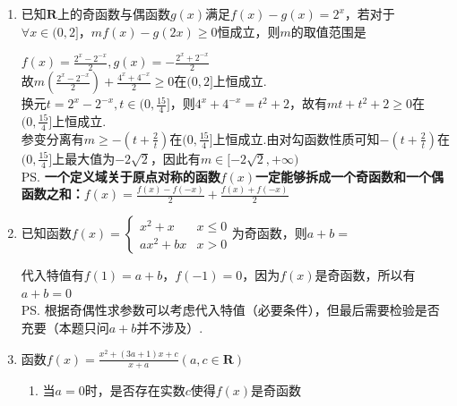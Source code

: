 \begin{enumerate}
\begin{enumerate}
\begin{jieda}
        把握定义求解有：$f(x) = \frac{a-\me^x}{1+a\cdot\me^x}, f(-x) = \frac{a-\me^{-x}}{1+a\cdot\me^{-x}} = \frac{a\me^{x}-1}{a+\me^{x}}$ \\
        由$f(x) = -f(-x)$知$\frac{a-\me^x}{1+a\cdot\me^x} = \frac{1-a\me^{x}}{a+\me^{x}}$，交叉相乘得到$a^2 - e^{2x} = 1-a^2e^{2x}$，移项整理得$(a^2-1) = (1-a^2)\cdot(e^{2x})$，因为此式恒成立，所以必有$a = \pm 1$
        \end{jieda}
        \item 已知$\mathbf{R}$上的奇函数与偶函数$g(x)$满足$f(x) - g(x) = 2^x$，若对于$\forall x \in (0, 2]$，$mf(x) - g(2x) \geq 0$恒成立，则$m$的取值范围是\blkda[2]{$[-2\sqrt{2}, +\infty)$}
        \begin{jieda}
            $f(x) = \frac{2^x - 2^{-x}}{2}, g(x) = -\frac{2^x+2^{-x}}{2}$ \\
            故$m(\frac{2^x - 2^{-x}}{2}) + \frac{4^x+4^{-x}}{2} \geq 0$在$(0, 2]$上恒成立. \\
            换元$t = 2^x - 2^{-x}, t \in (0, \frac{15}{4}]$，则$4^x+4^{-x} = t^2+2$，故有$mt + t^2 + 2 \geq 0$在$(0, \frac{15}{4}]$上恒成立. \\
            参变分离有$m \geq -(t + \frac{2}{t})$在$(0, \frac{15}{4}]$上恒成立.由对勾函数性质可知$-(t + \frac{2}{t})$在$(0, \frac{15}{4}]$上最大值为$-2\sqrt{2}$，因此有$m \in [-2\sqrt{2}, +\infty)$ \\
            \ps \textbf{一个定义域关于原点对称的函数$f(x)$一定能够拆成一个奇函数和一个偶函数之和：$f(x) = \frac{f(x) - f(-x)}{2} + \frac{f(x)+f(-x)}{2}$}
        \end{jieda}
        \item 已知函数$f(x) = \left \{ \begin{array}{ll}
            x^2 + x & x \leq 0 \\
            ax^2 + bx & x > 0
        \end{array}\right.$为奇函数，则$a+b = $
        \begin{jieda}
            代入特值有$f(1) = a+b$，$f(-1) = 0$，因为$f(x)$是奇函数，所以有$a+b = 0$ \\
            \ps 根据奇偶性求参数可以考虑代入特值（必要条件），但最后需要检验是否充要（本题只问$a+b$并不涉及）.
        \end{jieda}
        \item 函数$f(x) = \frac{x^2+(3a+1)x+c}{x+a} (a, c \in \mathbf{R})$
        \begin{enumerate}
            \item 当$a = 0$时，是否存在实数$c$使得$f(x)$是奇函数

\end{enumerate}
\end{enumerate}
\end{enumerate}
